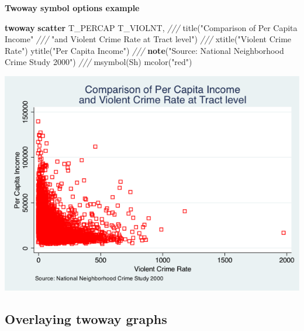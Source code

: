 \documentclass[
]{book}
\newenvironment{Shaded}{\begin{snugshade}}{\end{snugshade}}
\newcommand{\BaseNTok}[1]{\textcolor[rgb]{0.00,0.00,0.81}{#1}}
\newcommand{\CommentTok}[1]{\textcolor[rgb]{0.56,0.35,0.01}{\textit{#1}}}
\newcommand{\KeywordTok}[1]{\textcolor[rgb]{0.13,0.29,0.53}{\textbf{#1}}}
\newcommand{\NormalTok}[1]{#1}
\newcommand{\StringTok}[1]{\textcolor[rgb]{0.31,0.60,0.02}{#1}}
\begin{document}
\textbf{Twoway symbol options example}

\begin{Shaded}
\begin{Highlighting}[]
\KeywordTok{twoway} \KeywordTok{scatter}\NormalTok{ T\_PERCAP T\_VIOLNT, }\CommentTok{///}
    \BaseNTok{title}\NormalTok{(}\StringTok{"Comparison of Per Capita Income"} \CommentTok{///}
          \StringTok{"and Violent Crime Rate at Tract level"}\NormalTok{) }\CommentTok{///}
    \BaseNTok{xtitle}\NormalTok{(}\StringTok{"Violent Crime Rate"}\NormalTok{) }\BaseNTok{ytitle}\NormalTok{(}\StringTok{"Per Capita Income"}\NormalTok{) }\CommentTok{///}
    \KeywordTok{note}\NormalTok{(}\StringTok{"Source: National Neighborhood Crime Study 2000"}\NormalTok{) }\CommentTok{///}
    \BaseNTok{msymbol}\NormalTok{(Sh) mcolor(}\StringTok{"red"}\NormalTok{)}
\end{Highlighting}
\end{Shaded}

\includegraphics{Stata/StataGraphics/images/msymbol_mcolor.png}

\hypertarget{overlaying-twoway-graphs}{%
\subsection{Overlaying twoway graphs}\label{overlaying-twoway-graphs}}
\end{document}
